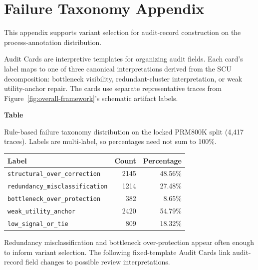 \appendix

\section{Failure Taxonomy Appendix}
\label{app:failure-taxonomy}

This appendix supports variant selection for audit-record construction on the process-annotation distribution.

Audit Cards are interpretive templates for organizing audit fields. Each card's label maps to one of three canonical interpretations derived from the SCU decomposition: bottleneck visibility, redundant-cluster interpretation, or weak utility-anchor repair. The cards use separate representative traces from Figure~\ref{fig:overall-framework}'s schematic artifact labels.

\par\medskip
{}\label{tab:failure-taxonomy}
\noindent\textbf{Table~\thetable}\par
\noindent Rule-based failure taxonomy distribution on the locked PRM800K split (4,417 traces). Labels are multi-label, so percentages need not sum to 100\%.
\begin{center}
\small
\renewcommand{\arraystretch}{1.08}
\begin{tabular}{lrr}
\toprule
\textbf{Label} & \textbf{Count} & \textbf{Percentage} \\
\midrule
\texttt{structural\_over\_correction} & 2145 & 48.56\% \\
\texttt{redundancy\_misclassification} & 1214 & 27.48\% \\
\texttt{bottleneck\_over\_protection} & 382 & 8.65\% \\
\texttt{weak\_utility\_anchor} & 2420 & 54.79\% \\
\texttt{low\_signal\_or\_tie} & 809 & 18.32\% \\
\bottomrule
\end{tabular}
\end{center}
\medskip

Redundancy misclassification and bottleneck over-protection appear often enough to inform variant selection. The following fixed-template Audit Cards link audit-record field changes to possible review interpretations.

